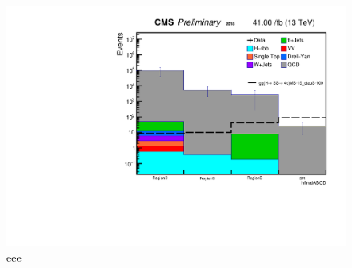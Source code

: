  \begin{figure}[h!]
   \caption{eee}
   \label{fig:ABCDmethod}
   \centering
   \includegraphics[width=0.67\linewidth]{figs/AnalysisNoteplot_MS-15_ctauS-100_hfinalABCD.pdf}
 \end{figure}
 
